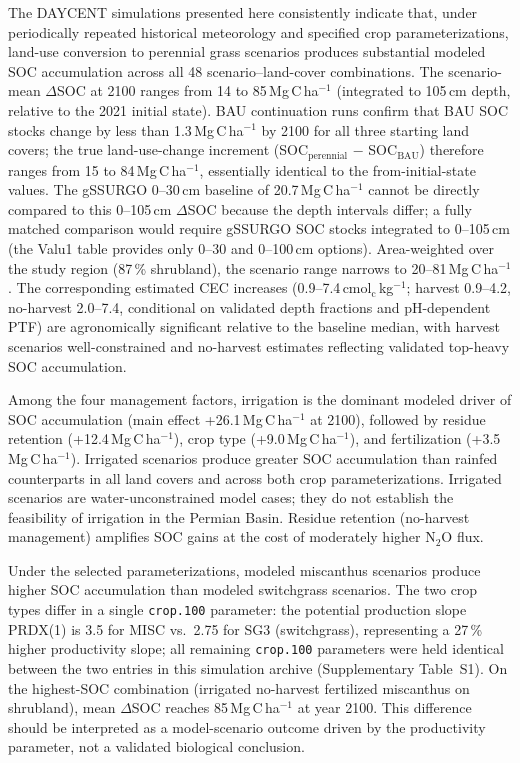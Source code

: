 \documentclass[11pt]{article}
\begin{document}
The DAYCENT simulations presented here consistently indicate that, under periodically repeated historical meteorology and specified crop parameterizations, land-use conversion to perennial grass scenarios produces substantial modeled SOC accumulation across all 48 scenario--land-cover combinations. The scenario-mean $\Delta$SOC at 2100 ranges from 14 to 85\,Mg\,C\,ha$^{-1}$ (integrated to 105\,cm depth, relative to the 2021 initial state). BAU continuation runs confirm that BAU SOC stocks change by less than 1.3\,Mg\,C\,ha$^{-1}$ by 2100 for all three starting land covers; the true land-use-change increment (SOC$_\text{perennial}$ $-$ SOC$_\text{BAU}$) therefore ranges from 15 to 84\,Mg\,C\,ha$^{-1}$, essentially identical to the from-initial-state values. The gSSURGO 0--30\,cm baseline of 20.7\,Mg\,C\,ha$^{-1}$ cannot be directly compared to this 0--105\,cm $\Delta$SOC because the depth intervals differ; a fully matched comparison would require gSSURGO SOC stocks integrated to 0--105\,cm (the Valu1 table provides only 0--30 and 0--100\,cm options). Area-weighted over the study region (87\,\% shrubland), the scenario range narrows to 20--81\,Mg\,C\,ha$^{-1}$. The corresponding estimated CEC increases (0.9--7.4\,cmol$_\text{c}$\,kg$^{-1}$; harvest 0.9--4.2, no-harvest 2.0--7.4, conditional on validated depth fractions and pH-dependent PTF) are agronomically significant relative to the baseline median, with harvest scenarios well-constrained and no-harvest estimates reflecting validated top-heavy SOC accumulation.

Among the four management factors, irrigation is the dominant modeled driver of SOC accumulation (main effect +26.1\,Mg\,C\,ha$^{-1}$ at 2100), followed by residue retention (+12.4\,Mg\,C\,ha$^{-1}$), crop type (+9.0\,Mg\,C\,ha$^{-1}$), and fertilization (+3.5\,Mg\,C\,ha$^{-1}$). Irrigated scenarios produce greater SOC accumulation than rainfed counterparts in all land covers and across both crop parameterizations. Irrigated scenarios are water-unconstrained model cases; they do not establish the feasibility of irrigation in the Permian Basin. Residue retention (no-harvest management) amplifies SOC gains at the cost of moderately higher N$_2$O flux.

Under the selected parameterizations, modeled miscanthus scenarios produce higher SOC accumulation than modeled switchgrass scenarios. The two crop types differ in a single \texttt{crop.100} parameter: the potential production slope PRDX(1) is 3.5 for MISC vs.\ 2.75 for SG3 (switchgrass), representing a 27\,\% higher productivity slope; all remaining \texttt{crop.100} parameters were held identical between the two entries in this simulation archive (Supplementary Table~S1). On the highest-SOC combination (irrigated no-harvest fertilized miscanthus on shrubland), mean $\Delta$SOC reaches 85\,Mg\,C\,ha$^{-1}$ at year 2100. This difference should be interpreted as a model-scenario outcome driven by the productivity parameter, not a validated biological conclusion.
\end{document}
